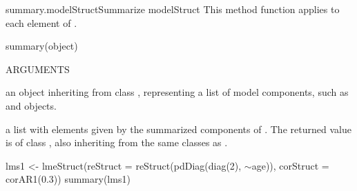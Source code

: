 \documentclass[pdftex]{article} \usepackage{url,graphicx}
\renewcommand{\Twiddle}{\mbox{\(\sim\)}}
\begin{document}
\begin{Helpfile}{summary.modelStruct}{Summarize modelStruct}
This method function applies  to each element of
.
\begin{Example}
summary(object)
\end{Example}
\begin{Argument}{ARGUMENTS}
\item[\Co{object:}]
an object inheriting from class ,
representing a list of model components, such as  and
 objects.
\end{Argument}
a list with elements given by the summarized components of
. The returned value is of class
, also inheriting from the same classes as
.
\need 15pt
\vspace{-16pt} 
\begin{Example}
lms1 <- lmeStruct(reStruct = reStruct(pdDiag(diag(2), \Twiddle age)),
   corStruct = corAR1(0.3))
summary(lms1)
\end{Example}
\end{Helpfile}
\end{document}

